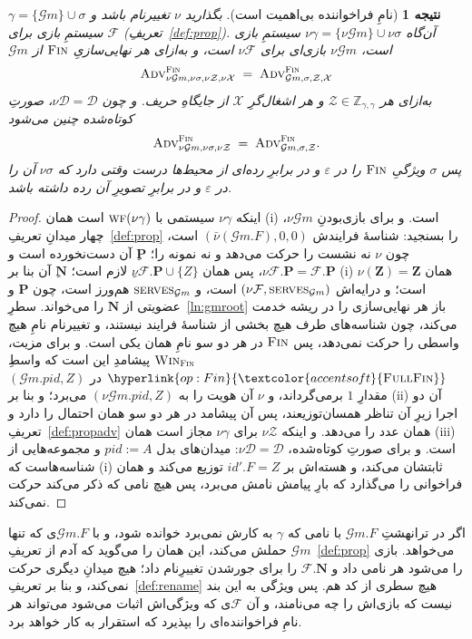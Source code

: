 \documentclass[10pt,oneside,openany]{book}
\newcommand{\Ps}{\mathbf{P}}
\newcommand{\PID}{\mathit{pid}}
\newcommand{\admits}{\mathbf{N}}
\newcommand{\Zpid}{\mathbf{Z}}
\newcommand{\serves}{\op{serves}}
\newcommand{\WF}{\op{wf}}
\newcommand{\F}{\mathcal{F}}
\newcommand{\Zenv}{\mathcal{Z}}
\newcommand{\Dum}{\mathcal{D}}
\newcommand{\advtg}{\op{Adv}}
\newcommand{\padv}[2]{\advtg^{#1}_{#2}}
\newcommand{\ZenvSet}{\mathbb{Z}}
\newcommand{\op}[1]{\textnormal{\textsc{#1}}}
\newcommand{\fopl}[1]{\hyperlink{op:#1}{\textcolor{accentsoft}{\op{Full}\op{#1}}}}
\newcommand{\id}{id}
\newcommand{\Gm}{\mathcal{G}m}
\newcommand{\Win}{\op{Win}}
\theoremstyle{accentdef}
\theoremstyle{accentplain}
\newtheorem{corollary}[definition]{نتیجه}
\begin{document}
\begin{corollary}[نامِ فراخواننده بی‌اهمیت است]\label{cor:callername}
بگذارید $\nu$ تغییرنام باشد و $\gamma = \{\Gm\} \cup \sigma$ سیستمِ بازی
برای $\F$ (تعریفِ~\ref{def:prop}). آن‌گاه $\nu\gamma = \{\nu\Gm\} \cup
\nu\sigma$ سیستمِ بازی است، $\nu\Gm$ بازی‌ای برای $\nu\F$ است، و به‌ازای هر
نهایی‌سازیِ $\op{Fin}$ از $\Gm$
\[
  \padv{\op{Fin}}{\nu\Gm,\nu\sigma,\nu\Zenv,\nu\mathcal{X}}
  \;=\;
  \padv{\op{Fin}}{\Gm,\sigma,\Zenv,\mathcal{X}}
\]
به‌ازای هر $\Zenv \in \ZenvSet_{\gamma,\gamma}$ و هر اشغال‌گرِ $\mathcal{X}$
از جایگاهِ حریف. و چون $\nu\Dum = \Dum$، صورتِ کوتاه‌شده چنین می‌شود
\[
  \padv{\op{Fin}}{\nu\Gm,\nu\sigma,\nu\Zenv} \;=\; \padv{\op{Fin}}{\Gm,\sigma,\Zenv} .
\]
پس $\sigma$ ویژگیِ $\op{Fin}$ را در $\varepsilon$ و در برابرِ رده‌ای از
محیط‌ها درست وقتی دارد که $\nu\sigma$ آن را در $\varepsilon$ و در برابرِ
تصویرِ آن رده داشته باشد.
\end{corollary}

\begin{proof}
اینکه $\nu\gamma$ سیستمی با $\WF(\nu\gamma)$ است همان (i) است. و برای
بازی‌بودنِ $\nu\Gm$، چهار میدانِ تعریفِ~\ref{def:prop} را بسنجید: شناسهٔ
فرایندش $(\bar\nu(\Gm.F),0,0)$ است، چون $\nu$ نه نشست را حرکت می‌دهد و نه
نمونه را؛ $\Ps$ِ آن دست‌نخورده است و $\nu\F.\Ps = \F.\Ps$، پس همان $\nu\F.\Ps
\cup \{Z\}$ِ لازم است؛ $\admits$ِ آن بنا بر (i) همان $\nu(\Zpid) = \Zpid$
است؛ و درایه‌اش $(\nu\F,\serves_{\Gm})$ است، و $\serves_{\Gm}$ هم‌ورز است،
چون $\Ps$ و عضویتی از $\admits$ را می‌خواند. سطرِ~\ref{ln:gmroot} باز هر
نهایی‌سازی را در ریشه خدمت می‌کند، چون شناسه‌های طرف هیچ بخشی از شناسهٔ
فرایند نیستند، و تغییرنام نامِ هیچ واسطی را حرکت نمی‌دهد، پس $\op{Fin}$ در
هر دو سو نامِ همان یکی است. و برای مزیت، $\Win_{\op{Fin}}$ پیشامدِ این است
که واسطِ $\fopl{Fin}$ در $(\Gm.\PID,Z)$ مقدارِ $1$ برمی‌گرداند، و $\nu$ آن
هویت را به $(\nu\Gm.\PID,Z)$ می‌برد؛ و بنا بر (ii) آن دو اجرا زیرِ آن تناظر
همسان‌توزیعند، پس آن پیشامد در هر دو سو همان احتمال را دارد و
تعریفِ~\ref{def:propadv} همان عدد را می‌دهد. و اینکه $\nu\Zenv$ برای
$\nu\gamma$ مجاز است همان (iii) است. و برای صورتِ کوتاه‌شده، $\nu\Dum =
\Dum$: میدان‌های بدل $\PID := A$ و مجموعه‌هایی از شناسه‌هاست که (i)
ثابتشان می‌کند، و هسته‌اش بر $\id'.F = Z$ توزیع می‌کند و همان فراخوانی را
می‌گذارد که بارِ پیامش نامش می‌برد، پس هیچ نامی که ذکر می‌کند حرکت
نمی‌کند.
\end{proof}

اگر در ترانهشتِ $\Gm.F$ با نامی که $\gamma$ به کارش نمی‌برد خوانده شود، و با
$\Gm.F$ی که تنها $\Gm$ حملش می‌کند، این همان را می‌گوید که آدم از
تعریفِ~\ref{def:prop} می‌خواهد. بازی را می‌شود هر نامی داد و $\F.\admits$
را برای جور‌شدن تغییرِنام داد؛ هیچ میدانِ دیگری حرکت نمی‌کند، و بنا بر
تعریفِ~\ref{def:rename} هیچ سطری از کد هم. پس ویژگی به این بند نیست که
بازی‌اش را چه می‌نامند، و آن $\F$ی که ویژگی‌اش اثبات می‌شود می‌تواند هر نامِ
فراخواننده‌ای را بپذیرد که استقرار به کار خواهد برد.
\end{document}
